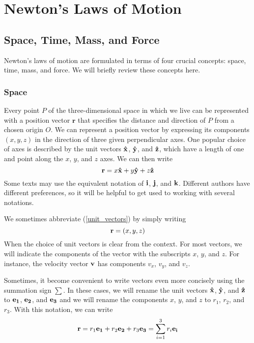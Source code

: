 \chapter{Newton's Laws of Motion}
\section{Space, Time, Mass, and Force}
Newton's laws of motion are formulated in terms of four crucial concepts: space, time, mass, and force. We will briefly review these 
concepts here. 

\subsection*{Space}
Every point $P$ of the three-dimensional space in which we live can be represented with a position vector $\bm{r}$ that specifies the distance and direction of $P$ from a chosen origin $O$. We can represent a position vector by expressing its components $(x,y,z)$ in the direction of three given perpendicular axes. One popular choice of axes is described by the unit vectors $\mathbf{\hat{x}}$, $\mathbf{\hat{y}}$, and $\mathbf{\hat{z}}$, which have a length of one and point along the $x$, $y$, and $z$ axes. We can then write 
\begin{equation} \label{unit_vectors}
    \mathbf{r} = x\mathbf{\hat{x}} + y\mathbf{\hat{y}} + z\mathbf{\hat{z}}
\end{equation}
Some texts may use the equivalent notation of $\mathbf{i}$, $\mathbf{j}$, and $\mathbf{k}$. Different authors have different preferences, so it will be helpful to get used to working with several notations.

We sometimes abbreviate (\ref{unit_vectors}) by simply writing
\begin{equation} \label{abb_vector}
    \mathbf{r} = (x,y,z)
\end{equation}
When the choice of unit vectors is clear from the context. For most vectors, we will indicate the components of the vector with the subscripts $x$, $y$, and $z$. For instance, the velocity vector $\mathbf{v}$ has components $v_x$, $v_y$, and $v_z$.

Sometimes, it become convenient to write vectors even more concisely using the summation sign $\sum$. In these cases, we will rename the unit vectors $\mathbf{\hat{x}}$, $\mathbf{\hat{y}}$, and $\mathbf{\hat{z}}$ to $\mathbf{e_1}$, $\mathbf{e_2}$, and $\mathbf{e_3}$ and we will rename the components $x$, $y$, and $z$ to $r_1$, $r_2$, and $r_3$. With this notation, we can write
\[ \mathbf{r} = r_1\mathbf{e_1} + r_2\mathbf{e_2} + r_3\mathbf{e_3} = \sum_{i=1}^3 r_i\mathbf{e_i} \]

